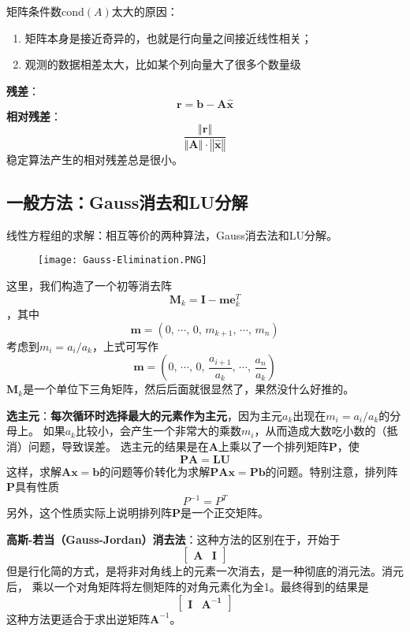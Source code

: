 \documentclass[14pt, letterpaper, UTF8, fontset=windowsnew, heading=true]{article}
\providecommand{\norm}[1]{\left\Vert#1\right\Vert}
\begin{document}
\par
矩阵条件数$\text{cond}(A)$太大的原因：
\begin{enumerate}
	\item
	矩阵本身是接近奇异的，也就是行向量之间接近线性相关；
	\item
	观测的数据相差太大，比如某个列向量大了很多个数量级
\end{enumerate}

\par
\textbf{残差}：$$\bm{r}=\bm{b}-\bm{A}\hat{\bm{x}}$$
\textbf{相对残差}：$$\frac{\norm{\bm{r}}}{\norm{\bm{A}}\cdot\norm{\hat{\bm{x}}}}$$
稳定算法产生的相对残差总是很小。

\subsection{一般方法：Gauss消去和LU分解}

\par
线性方程组的求解：相互等价的两种算法，Gauss消去法和LU分解。
\begin{figure}[h]
	\texttt{[image: Gauss-Elimination.PNG]}
	\centering
\end{figure}
这里，我们构造了一个初等消去阵
$$\bm{M}_k=\bm{I}-\bm{m}\bm{e}_k^T$$
，其中
$$\bm{m}=(0,\,\cdots,\,0,\,m_{k+1},\,\cdots,\, m_n)$$
考虑到$m_i=a_i/a_k$，上式可写作
$$\bm{m}=(0,\,\cdots,\,0,\,\frac{a_{i+1}}{a_k},\,\cdots,\, \frac{a_n}{a_k})$$
$\bm{M}_k$是一个单位下三角矩阵，然后后面就很显然了，果然没什么好推的。

\par
\textbf{选主元}：\textbf{每次循环时选择最大的元素作为主元}，因为主元$a_k$出现在$m_i=a_i/a_k$的分母上。
如果$a_k$比较小，会产生一个非常大的乘数$m_i$，从而造成大数吃小数的（抵消）问题，导致误差。
选主元的结果是在$\bm{A}$上乘以了一个排列矩阵$\bm{P}$，使
$$\bm{PA}=\bm{LU}$$
这样，求解$\bm{Ax}=\bm{b}$的问题等价转化为求解$\bm{PAx}=\bm{Pb}$的问题。特别注意，排列阵$\bm{P}$具有性质
$$P^{-1}=P^T$$
另外，这个性质实际上说明排列阵$\bm{P}$是一个正交矩阵。

\par
\textbf{高斯-若当（Gauss-Jordan）消去法}：这种方法的区别在于，开始于
$$\left[\begin{array}{c|c} \bm{A} &\bm{I} \end{array}\right]$$
但是行化简的方式，是将非对角线上的元素一次消去，是一种彻底的消元法。消元后，
乘以一个对角矩阵将左侧矩阵的对角元素化为全1。最终得到的结果是
$$\left[\begin{array}{c|c} \bm{I} &\bm{A^{-1}} \end{array}\right]$$
这种方法更适合于求出逆矩阵$\bm{A}^{-1}$。
\end{document}
